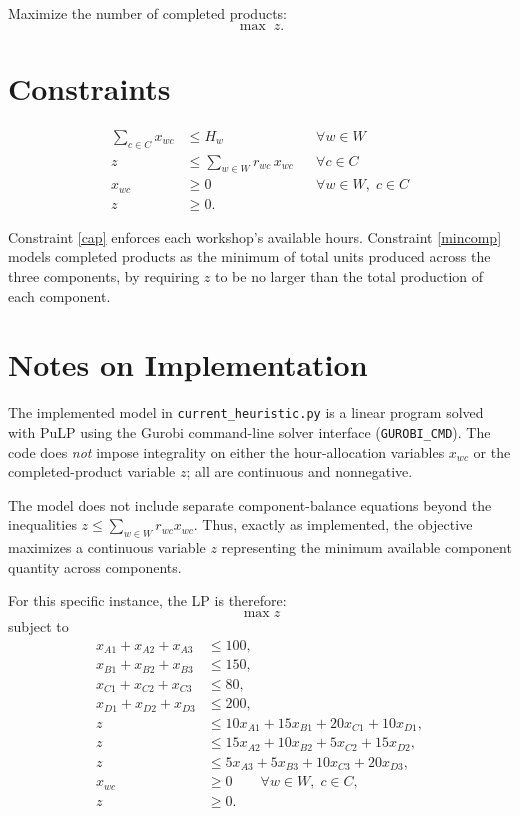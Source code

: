Maximize the number of completed products:
\[
\max \; z.
\]

\section*{Constraints}

\begin{align}
\sum_{c \in C} x_{wc} &\le H_w
&& \forall w \in W
\label{cap}\\
z &\le \sum_{w \in W} r_{wc}\, x_{wc}
&& \forall c \in C
\label{mincomp}\\
x_{wc} &\ge 0
&& \forall w \in W,\; c \in C
\label{nonnegx}\\
z &\ge 0.
\label{nonnegz}
\end{align}

Constraint \eqref{cap} enforces each workshop's available hours.  
Constraint \eqref{mincomp} models completed products as the minimum of total units produced across the three components, by requiring $z$ to be no larger than the total production of each component.

\section*{Notes on Implementation}

The implemented model in \texttt{current\_heuristic.py} is a linear program solved with PuLP using the Gurobi command-line solver interface (\texttt{GUROBI\_CMD}). The code does \emph{not} impose integrality on either the hour-allocation variables $x_{wc}$ or the completed-product variable $z$; all are continuous and nonnegative.

The model does not include separate component-balance equations beyond the inequalities $z \le \sum_{w \in W} r_{wc}x_{wc}$. Thus, exactly as implemented, the objective maximizes a continuous variable $z$ representing the minimum available component quantity across components.

For this specific instance, the LP is therefore:
\[
\max z
\]
subject to
\begin{align*}
x_{A1}+x_{A2}+x_{A3} &\le 100,\\
x_{B1}+x_{B2}+x_{B3} &\le 150,\\
x_{C1}+x_{C2}+x_{C3} &\le 80,\\
x_{D1}+x_{D2}+x_{D3} &\le 200,\\
z &\le 10x_{A1}+15x_{B1}+20x_{C1}+10x_{D1},\\
z &\le 15x_{A2}+10x_{B2}+5x_{C2}+15x_{D2},\\
z &\le 5x_{A3}+5x_{B3}+10x_{C3}+20x_{D3},\\
x_{wc} &\ge 0 \qquad \forall w\in W,\; c\in C,\\
z &\ge 0.
\end{align*}
